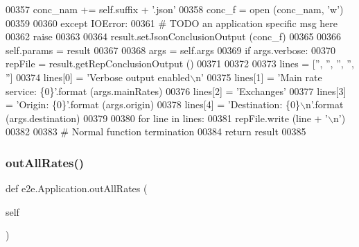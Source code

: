\begin{DoxyCode}
00357             conc\_nam += self.suffix + \textcolor{stringliteral}{'.json'}
00358             conc\_f    = open (conc\_nam, \textcolor{stringliteral}{'w'})
00359             
00360         \textcolor{keywordflow}{except} IOError:
00361             \textcolor{comment}{# TODO an application specific msg here}
00362             \textcolor{keywordflow}{raise}        
00363 
00364         result.setJsonConclusionOutput (conc\_f)
00365         
00366         self.params = result
00367         
00368         args = self.args                
00369         \textcolor{keywordflow}{if} args.verbose:
00370             repFile = result.getRepConclusionOutput ()
00371                         
00372             
00373             lines = [\textcolor{stringliteral}{''}, \textcolor{stringliteral}{''}, \textcolor{stringliteral}{''}, \textcolor{stringliteral}{''}, \textcolor{stringliteral}{''}]
00374             lines[0] = \textcolor{stringliteral}{'Verbose output enabled\(\backslash\)n'}
00375             lines[1] = \textcolor{stringliteral}{'Main rate service: \{0\}'}.format (args.mainRates)
00376             lines[2] = \textcolor{stringliteral}{'Exchanges'}
00377             lines[3] = \textcolor{stringliteral}{'Origin:            \{0\}'}.format (args.origin)
00378             lines[4] = \textcolor{stringliteral}{'Destination:       \{0\}\(\backslash\)n'}.format (args.destination)
00379 
00380             \textcolor{keywordflow}{for} line \textcolor{keywordflow}{in} lines:
00381                 repFile.write (line + \textcolor{stringliteral}{'\(\backslash\)n'})
00382             
00383         \textcolor{comment}{# Normal function termination }
00384         \textcolor{keywordflow}{return} result 
00385         
\end{DoxyCode}
\mbox{\label{classe2e_1_1_application_acd7798aa633d75001b6f6fde556b8a51}} 
\subsubsection{\texorpdfstring{out\+All\+Rates()}{outAllRates()}}
{\footnotesize\ttfamily def e2e.\+Application.\+out\+All\+Rates (\begin{DoxyParamCaption}\item[{}]{self }\end{DoxyParamCaption})}



